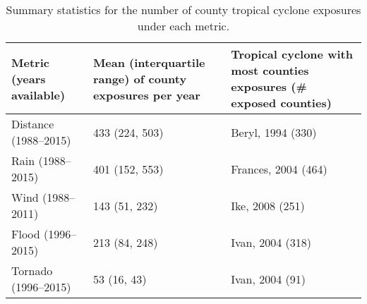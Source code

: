 \begin{table}[ht]
\centering
\caption{Summary statistics for the number of county tropical cyclone exposures under each metric.} 
\label{tab:exposuresummaries}
\begin{tabular}{p{4.5cm}p{4.5cm}p{4.5cm}}
  \toprule
Metric (years available) & Mean (interquartile range) of county exposures per year & Tropical cyclone with most counties exposures (\# exposed counties) \\ 
  \midrule
Distance (1988--2015) & 433 (224, 503) & Beryl, 1994 (330) \\ 
  Rain (1988--2015) & 401 (152, 553) & Frances, 2004 (464) \\ 
  Wind (1988--2011) & 143 (51, 232) & Ike, 2008 (251) \\ 
  Flood (1996--2015) & 213 (84, 248) & Ivan, 2004 (318) \\ 
  Tornado (1996--2015) & 53 (16, 43) & Ivan, 2004 (91) \\ 
   \bottomrule
\end{tabular}
\end{table}
